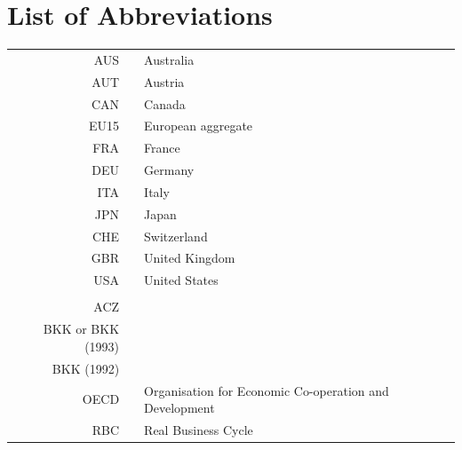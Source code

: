 \section*{List of Abbreviations}

\begin{tabular}{rp{0.2cm}lp{1cm}}
  AUS & & Australia \\
  AUT & & Austria \\
  CAN & & Canada \\
  EU15 & & European aggregate \\
  FRA & & France \\
  DEU & & Germany \\
  ITA & & Italy \\
  JPN & & Japan \\
  CHE & & Switzerland \\
  GBR & & United Kingdom \\
  USA & & United States \\
  & &  \\
  ACZ && \cite{Ambler:2004aa} \\
  BKK or BKK (1993) && \cite{Backus:1993aa}\\
  BKK (1992) && \cite{Backus:1992aa}\\
  OECD & & Organisation for Economic Co-operation and Development\\
  RBC && Real Business Cycle \\

\end{tabular}\\
